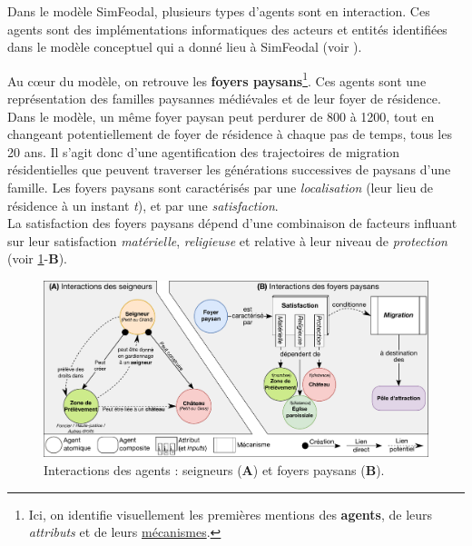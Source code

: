 Dans le modèle SimFeodal, plusieurs types d'agents sont en interaction. Ces agents sont des implémentations informatiques des acteurs et entités identifiées dans le modèle conceptuel qui a donné lieu à SimFeodal (voir \textcite[Tableau 1, \ppno~309--310]{cura_transition_2017}).

\noindent Au cœur du modèle, on retrouve les \textbf{foyers paysans}\footnote{
	Ici, on identifie visuellement les premières mentions des \textbf{agents}, de leurs \textit{attributs} et de leurs \ul{mécanismes}.
}.
Ces agents sont une représentation des familles paysannes médiévales et de leur foyer de résidence.
Dans le modèle, un même foyer paysan peut perdurer de 800 à 1200, tout en changeant potentiellement de foyer de résidence à chaque pas de temps, tous les 20 ans.
Il s'agit donc d'une agentification des trajectoires de migration résidentielles que peuvent traverser les générations successives de paysans d'une famille.
Les foyers paysans sont caractérisés par une \textit{localisation} (leur lieu de résidence à un instant \textit{t}), et par une \textit{satisfaction}.\\
La satisfaction des foyers paysans dépend d'une combinaison de facteurs influant sur leur satisfaction \textit{matérielle}, \textit{religieuse} et relative à leur niveau de \textit{protection} (voir \cref{fig:interactions-agents}-\textbf{B}).

\begin{figure}[H]
	\centering
	\includegraphics[width=\linewidth]{img/agents_interactions.pdf}
	\caption{Interactions des agents : seigneurs (\textbf{A}) et foyers paysans (\textbf{B}).}
	\label{fig:interactions-agents}
\end{figure}

